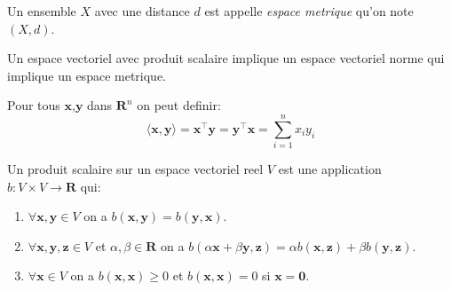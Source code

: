 \begin{definition}
Un ensemble $X$ avec une distance $d$ est appelle \emph{espace metrique} qu'on note $(X,d)$.
\end{definition}
\begin{remark}
Un espace vectoriel avec produit scalaire implique un espace vectoriel norme qui implique un espace metrique.
\end{remark}
\begin{definition}
Pour tous $\boldsymbol{x}$,$\boldsymbol{y}$ dans $\mathbf{R}^{n}$ on peut definir:
$$
\langle \boldsymbol{x},\boldsymbol{y} \rangle =\boldsymbol{x}^{\top}\boldsymbol{y}=\boldsymbol{y}^{\top}\boldsymbol{x}=\sum_{i=1}^{n} x_{i}y_{i}
$$
\end{definition}
\begin{definition}
Un produit scalaire sur un espace vectoriel reel $V$ est une application $b:V\times V\to \mathbf{R}$ qui:
\begin{enumerate}
\item $\forall \boldsymbol{x},\boldsymbol{y}\in V$ on a $b(\boldsymbol{x},\boldsymbol{y})=b(\boldsymbol{y},\boldsymbol{x})$.
\item $\forall \boldsymbol{x},\boldsymbol{y},\boldsymbol{z}\in V$ et $\alpha,\beta \in \mathbf{R}$ on a $b(\alpha \boldsymbol{x}+\beta \boldsymbol{y},\boldsymbol{z})=\alpha b(\boldsymbol{x},\boldsymbol{z})+\beta b(\boldsymbol{y},\boldsymbol{z})$.
\item \label{prop3} $\forall \boldsymbol{x}\in V$ on a $b(\boldsymbol{x},\boldsymbol{x})\ge 0$ et $b(\boldsymbol{x},\boldsymbol{x})=0$ si $\boldsymbol{x}=\boldsymbol{0}$.
\end{enumerate}
\end{definition}


